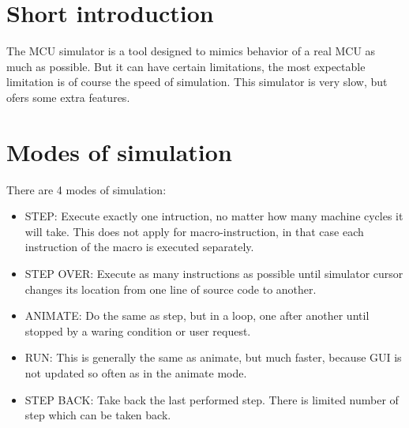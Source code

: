 \section{Short introduction}
    The MCU simulator is a tool designed to mimics behavior of a real MCU as much as possible. But it can have certain limitations, the most expectable limitation is of course the speed of simulation. This simulator is very slow, but ofers some extra features.

\section{Modes of simulation}
    There are 4 modes of simulation:
    \begin{itemize}
        \item STEP: Execute exactly one intruction, no matter how many machine cycles it will take. This does not apply for macro-instruction, in that case each instruction of the macro is executed separately.
        \item STEP OVER: Execute as many instructions as possible until simulator cursor changes its location from one line of source code to another.
        \item ANIMATE: Do the same as step, but in a loop, one after another until stopped by a waring condition or user request.
        \item RUN: This is generally the same as animate, but much faster, because GUI is not updated so often as in the animate mode.
        \item STEP BACK: Take back the last performed step. There is limited number of step which can be taken back.
    \end{itemize}
